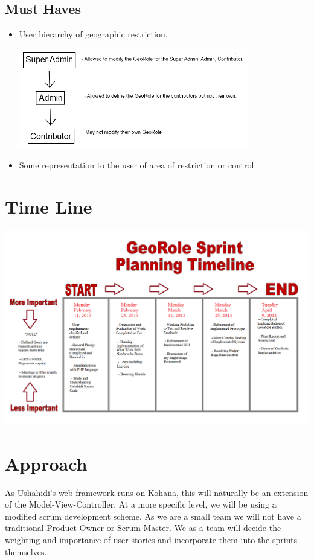\documentclass{article}
\begin{document}
\subsection{Must Haves}
\begin{itemize}
\item User hierarchy of geographic restriction.\\
\begin{minipage}{\linewidth}
  \centering
  \includegraphics[width=100mm]{permissions.png}
\end{minipage}
\item Some representation to the user of area of restriction or control.
\end{itemize}

\section{Time Line}
\begin{minipage}{\linewidth}
  \centering
  \hspace*{-1in}
  \includegraphics[width=180mm]{UshahidiTimeline.png}
\end{minipage}

\section{Approach}
As Ushahidi's web framework runs on Kohana, this will naturally be an extension of the Model-View-Controller. At a more specific level, we will be using a modified scrum development scheme. As we are a small team we will not have a traditional Product Owner or Scrum Master. We as a team will decide the weighting and importance of user stories and incorporate them into the sprints themselves.
\end{document}
